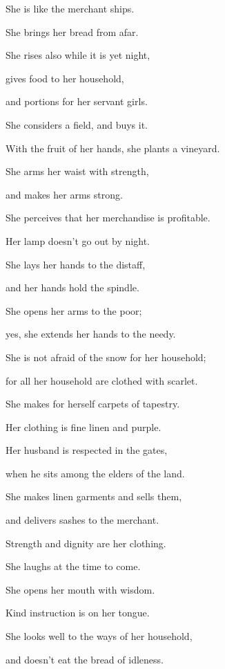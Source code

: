 {\par }{\Q {}She is like the merchant ships.
\par }{\QB She brings her bread from afar.
\par }{\Q {}She rises also while it is yet night,
\par }{\QB gives food to her household,
\par }{\QB and portions for her servant girls.
\par }{\Q {}She considers a field, and buys it.
\par }{\QB With the fruit of her hands, she plants a vineyard.
\par }{\Q {}She arms her waist with strength,
\par }{\QB and makes her arms strong.
\par }{\Q {}She perceives that her merchandise is profitable.
\par }{\QB Her lamp doesn’t go out by night.
\par }{\Q {}She lays her hands to the distaff,
\par }{\QB and her hands hold the spindle.
\par }{\Q {}She opens her arms to the poor;
\par }{\QB yes, she extends her hands to the needy.
\par }{\Q {}She is not afraid of the snow for her household;
\par }{\QB for all her household are clothed with scarlet.
\par }{\Q {}She makes for herself carpets of tapestry.
\par }{\QB Her clothing is fine linen and purple.
\par }{\Q {}Her husband is respected in the gates,
\par }{\QB when he sits among the elders of the land.
\par }{\Q {}She makes linen garments and sells them,
\par }{\QB and delivers sashes to the merchant.
\par }{\Q {}Strength and dignity are her clothing.
\par }{\QB She laughs at the time to come.
\par }{\Q {}She opens her mouth with wisdom.
\par }{\QB Kind instruction is on her tongue.
\par }{\Q {}She looks well to the ways of her household,
\par }{\QB and doesn’t eat the bread of idleness.
}

